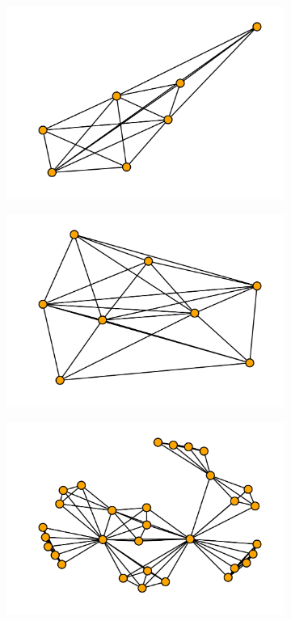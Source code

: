\documentclass{article}
\begin{document}
\begin{figure}[!hbtp]
\begin{subfigure}{0.3\textwidth}
    \end{subfigure}
    \begin{subfigure}{0.3\textwidth}
        \includegraphics[width=\textwidth]{./assets/images/coauthor06.pdf}
    \end{subfigure}
    \begin{subfigure}{0.3\textwidth}
        \includegraphics[width=\textwidth]{./assets/images/coauthor07.pdf}
    \end{subfigure}
    \begin{subfigure}{0.3\textwidth}
        \includegraphics[width=\textwidth]{./assets/images/coauthor08.pdf}

\end{subfigure}
\end{figure}
\end{document}
